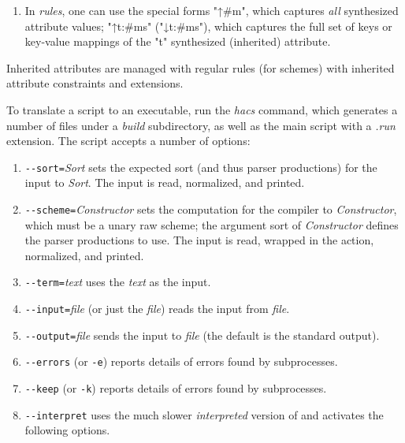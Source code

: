\documentclass[11pt]{article} %
\begin{document}
\begin{manual}
\begin{enumerate}
  \item In \emph{rules}, one can use the special forms "↑#m", which captures \emph{all} synthesized
    attribute values; "↑t{:#ms}" ("↓t{:#ms}"), which captures the full set of keys or key-value
    mappings of the "t" synthesized (inherited) attribute.

  \end{enumerate}
  Inherited attributes are managed with regular rules (for schemes) with inherited attribute
  constraints and extensions.
\end{manual}

\begin{manual}\label{man:run}\leavevmode
  To translate a \HAX script to an executable, run the \emph{hacs} command, which generates a number
  of files under a \emph{build} subdirectory, as well as the main script with a \emph{.run}
  extension.  The script accepts a number of options:
  \begin{enumerate}

  \item \verb"--sort="\emph{Sort} sets the expected sort (and thus parser productions) for the input to
    \emph{Sort}. The input is read, normalized, and printed.

  \item \verb"--scheme="\emph{Constructor} sets the computation for the compiler to \emph{Constructor},
    which must be a unary raw scheme; the argument sort of \emph{Constructor} defines the parser
    productions to use.  The input is read, wrapped in the action, normalized, and printed.

  \item \verb"--term="\emph{text} uses the \emph{text} as the input.

  \item \verb"--input="\emph{file} (or just the \emph{file}) reads the input from \emph{file}.

  \item \verb"--output="\emph{file} sends the input to \emph{file} (the default is the standard output).

  \item \verb"--errors" (or \verb'-e') reports details of errors found by subprocesses.

  \item \verb"--keep" (or \verb'-k') reports details of errors found by subprocesses.

  \item \verb"--interpret" uses the much slower \emph{interpreted} version of \HAX and activates the
    following options.


\end{enumerate}
\end{manual}
\end{document}
